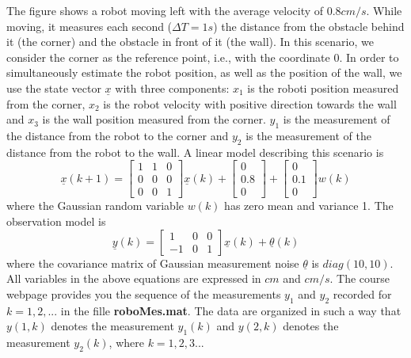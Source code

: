 \documentclass{article}
\begin{document}
\noindent The figure shows a robot moving left with the average velocity of $0.8cm/s$.
While moving, it measures each second ($\Delta T = 1s$) the distance from the obstacle
behind it (the corner) and the obstacle in front of it (the wall). In this scenario,
we consider the corner as the reference point, i.e., with the coordinate 0. 
In order to simultaneously estimate the robot position, as well
as the position of the wall, we use the state vector $\underline{x}$ with three components: 
$x_1$ is the roboti position measured from the corner, $x_2$ is the robot velocity with
positive direction towards the wall and $x_3$ is the wall position measured from
the corner.  $y_1$ is the measurement of the distance from the robot to the corner
and $y_2$ is the measurement of the distance from the robot to the wall. A linear model describing this scenario is
\begin{equation}
  \underline{x}(k+1)=\left[ 
  \begin{array}{ccc}
     1 & 1 & 0  \\
     0 & 0 & 0  \\
     0 & 0 & 1 
  \end{array}
   \right] \underline{x}(k)+
   \left[ 
  \begin{array}{c}
     0   \\
     0.8   \\
     0
  \end{array}
   \right]+ \left[
     \begin{array}{c}
     0   \\
     0.1   \\
     0
  \end{array}
   \right] w(k)
\end{equation}
where the Gaussian random variable $w(k)$ has zero mean and variance 1. 
The observation model is
\begin{equation}
 \underline{y}(k) =\left[
     \begin{array}{ccc}
     1 & 0 &  0  \\
     -1 & 0 & 1   
  \end{array}
   \right] \underline{x}(k)+\underline{\theta}(k)
\end{equation}
where the covariance matrix of Gaussian measurement noise $\underline{\theta}$ is $diag(10, 10)$. All variables in the above equations are expressed in $cm$ and $cm/s$. The course webpage provides you the sequence of the measurements $y_1$ and $y_2$ recorded for 
$k = 1, 2,... $ in the fille {\bf roboMes.mat}. The data are organized in such a way that $y(1, k)$ denotes the measurement $y_1(k)$ and $y(2, k)$ denotes the measurement $y_2(k)$, where $k=1,2,3...$
\end{document}
